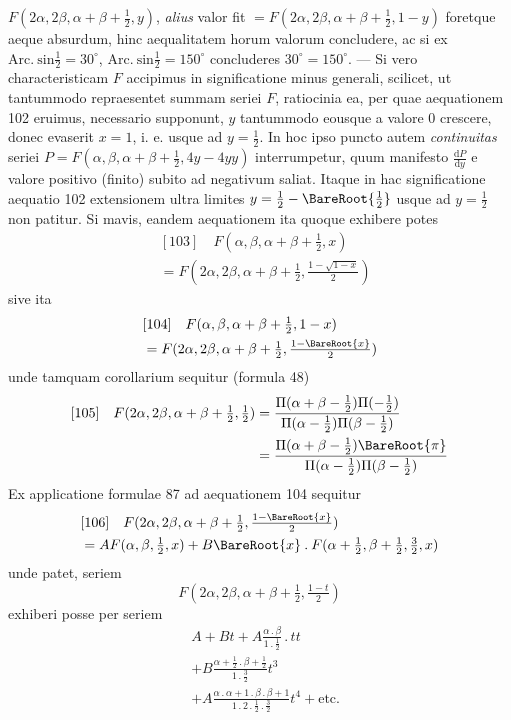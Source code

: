 $F(2\alpha,2\beta,\alpha+\beta+\frac12,y)$, \textit{alius} valor fit $=F(2\alpha,2\beta,\alpha+\beta+\frac12,1-y)$ foretque aeque
absurdum, hinc aequalitatem horum valorum concludere, ac si ex $\mathrm{Arc.\ sin}\frac12=30^\circ$,
$\mathrm{Arc.\ sin}\frac12=150^\circ$ concluderes $30^\circ=150^\circ$. --- Si vero characteristicam $F$ accipimus in significatione minus generali, scilicet, ut tantummodo repraesentet summam seriei $F$, ratiocinia ea, per quae aequationem 102 eruimus, necessario supponunt, $y$ tantummodo eousque a valore 0 crescere, donec evaserit $x=1$, i. e. usque ad
$y=\frac12$. In hoc ipso puncto autem \textit{continuitas} seriei $P=F(\alpha,\beta,\alpha+\beta+\frac12,4y-4yy)$
interrumpetur, quum manifesto $\frac{\mathrm dP}{\mathrm dy}$ e valore positivo (finito) subito ad negativum saliat. Itaque in hac significatione aequatio 102 extensionem ultra limites
$y=\frac12-\BareRoot{\frac12}$ usque ad $y=\frac12$ non patitur. Si mavis, eandem aequationem ita
quoque exhibere potes
\[
\begin{aligned}&[103]\quad F(\alpha,\beta,\alpha+\beta+\tfrac12,x)\\&=F(2\alpha,2\beta,\alpha+\beta+\tfrac12,\tfrac{1-\sqrt{1-x}}2)\end{aligned}
\]
sive ita
\[
\begin{aligned}&[104]\quad F(\alpha,\beta,\alpha+\beta+\tfrac12,1-x)\\&=F(2\alpha,2\beta,\alpha+\beta+\tfrac12,\tfrac{1-\BareRoot{x}}2)\end{aligned}
\]
unde tamquam corollarium sequitur (formula 48)
\[
\begin{aligned}
{}[105]\quad F(2\alpha,2\beta,\alpha+\beta+\tfrac12,\tfrac12)&=\frac{\Pi(\alpha+\beta-\tfrac12)\Pi(-\tfrac12)}{\Pi(\alpha-\tfrac12)\Pi(\beta-\tfrac12)}\\
&=\frac{\Pi(\alpha+\beta-\tfrac12)\BareRoot{\pi}}{\Pi(\alpha-\tfrac12)\Pi(\beta-\tfrac12)}
\end{aligned}
\]
Ex applicatione formulae 87 ad aequationem 104 sequitur
\[
\begin{aligned}&[106]\quad F(2\alpha,2\beta,\alpha+\beta+\tfrac12,\tfrac{1-\BareRoot{x}}2)\\&=AF(\alpha,\beta,\tfrac12,x)+B\BareRoot{x}\mathbin{.}F(\alpha+\tfrac12,\beta+\tfrac12,\tfrac32,x)\end{aligned}
\]
unde patet, seriem
\[
F(2\alpha,2\beta,\alpha+\beta+\tfrac12,\tfrac{1-t}2)
\]
exhiberi posse per seriem
\[
\begin{aligned}&A+Bt+A\frac{\alpha\mathbin{.}\beta}{1\mathbin{.}\tfrac12}\mathbin{.}tt\\&+B\frac{\alpha+\tfrac12\mathbin{.}\beta+\tfrac12}{1\mathbin{.}\tfrac32}t^3\\&+A\frac{\alpha\mathbin{.}\alpha+1\mathbin{.}\beta\mathbin{.}\beta+1}{1\mathbin{.}2\mathbin{.}\tfrac12\mathbin{.}\tfrac32}t^4+\text{etc.}\end{aligned}
\]
